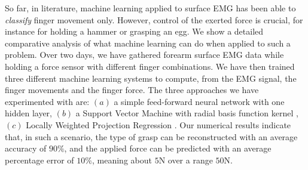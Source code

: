 So far, in literature, machine learning applied to surface EMG has
been able to \emph{classify} finger movement only.  However,
control of the exerted force is crucial, for instance for holding
a hammer or grasping an egg. We show a detailed comparative
analysis of what machine learning can do when applied to such a
problem. Over two days, we have gathered forearm surface EMG data
while holding a force sensor with different finger combinations.
We have then trained three different machine learning systems to
compute, from the EMG signal, the finger movements and the finger
force. The three approaches we have experimented with are: $(a)$ a
simple feed-forward neural network with one hidden layer, $(b)$ a
Support Vector Machine with radial basis function kernel
\cite{BGV92}, $(c)$ Locally Weighted Projection Regression
\cite{lwpr}.
%
Our numerical results indicate that, in such a scenario, the type of
grasp can be reconstructed with an average accuracy of $90\%$, and the
applied force can be predicted with an average percentage error of
$10\%$, meaning about $5$N over a range $50$N.
